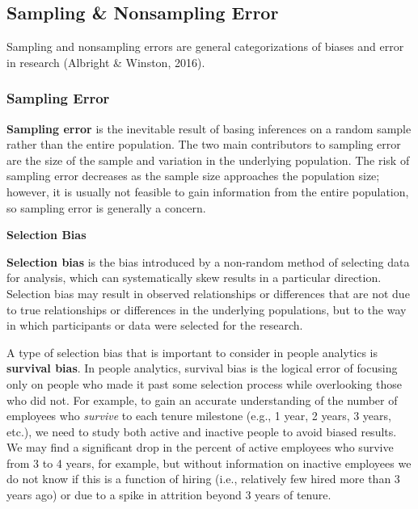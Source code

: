 \documentclass[]{book}
\begin{document}
\hypertarget{sampling-nonsampling-error}{%
\subsection{Sampling \& Nonsampling Error}\label{sampling-nonsampling-error}}

Sampling and nonsampling errors are general categorizations of biases and error in research (Albright \& Winston, 2016).

\hypertarget{sampling-error}{%
\subsubsection{Sampling Error}\label{sampling-error}}

\textbf{Sampling error} is the inevitable result of basing inferences on a random sample rather than the entire population. The two main contributors to sampling error are the size of the sample and variation in the underlying population. The risk of sampling error decreases as the sample size approaches the population size; however, it is usually not feasible to gain information from the entire population, so sampling error is generally a concern.

\textbf{Selection Bias}

\textbf{Selection bias} is the bias introduced by a non-random method of selecting data for analysis, which can systematically skew results in a particular direction. Selection bias may result in observed relationships or differences that are not due to true relationships or differences in the underlying populations, but to the way in which participants or data were selected for the research.

A type of selection bias that is important to consider in people analytics is \textbf{survival bias}. In people analytics, survival bias is the logical error of focusing only on people who made it past some selection process while overlooking those who did not. For example, to gain an accurate understanding of the number of employees who \emph{survive} to each tenure milestone (e.g., 1 year, 2 years, 3 years, etc.), we need to study both active and inactive people to avoid biased results. We may find a significant drop in the percent of active employees who survive from 3 to 4 years, for example, but without information on inactive employees we do not know if this is a function of hiring (i.e., relatively few hired more than 3 years ago) or due to a spike in attrition beyond 3 years of tenure.
\end{document}
